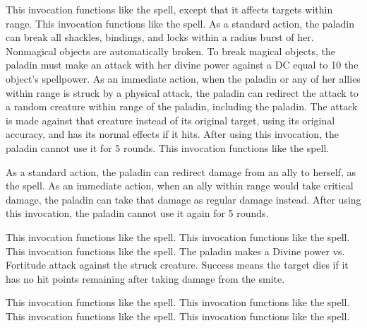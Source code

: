  This invocation functions like the  spell, except that it affects targets within \rngmed range.
 This invocation functions like the  spell.
As a standard action, the paladin can break all shackles, bindings, and locks within a \arealarge radius burst of her.
Nonmagical objects are automatically broken.
To break magical objects, the paladin must make an attack with her divine power against a DC equal to 10 \add the object's spellpower.
As an immediate action, when the paladin or any of her allies within \rngclose range is struck by a physical attack, the paladin can redirect the attack to a random creature within \rngclose range of the paladin, including the paladin.
The attack is made against that creature instead of its original target, using its original accuracy, and has its normal effects if it hits.
After using this invocation, the paladin cannot use it for 5 rounds.
 This invocation functions like the  spell.

As a standard action, the paladin can redirect damage from an ally to herself, as the  spell.
As an immediate action, when an ally within \rngmed range would take critical damage, the paladin can take that damage as regular damage instead.
After using this invocation, the paladin cannot use it again for 5 rounds.

 This invocation functions like the 
spell.
 This invocation functions like the  spell.
 This invocation functions like the 
spell.
The paladin makes a Divine power vs. Fortitude attack against the struck creature.
Success means the target dies if it has no hit points remaining after taking damage from the smite.

 This invocation functions like the  spell.
 This invocation functions like the  spell.
 This invocation functions like the  spell.
 This invocation functions like the  spell.

